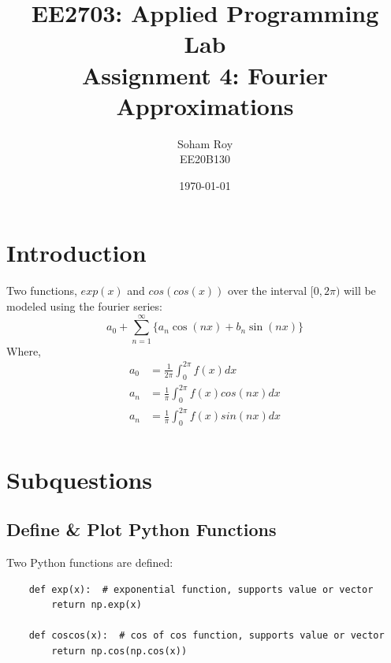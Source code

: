 \documentclass[12pt, a4paper]{article}
\title{EE2703: Applied Programming Lab \\ \Large Assignment 4: Fourier Approximations}
\author{Soham Roy \\ \normalsize EE20B130}
\date{\today}
\begin{document}
\maketitle %


\section{Introduction}
Two functions, $exp(x)$ and $cos(cos(x))$ over the interval $[0,2\pi)$ will be modeled using
the fourier series:
\begin{equation*}
    a_0 + \sum_{n=1}^{\infty} \{a_n \cos(nx) + b_n \sin(nx)\}
\end{equation*}
Where,
\begin{align*}
    a_0 & = \frac{1}{2\pi} \int_{0}^{2\pi} f(x) dx       \\
    a_n & = \frac{1}{\pi} \int_{0}^{2\pi} f(x)cos(nx) dx \\
    a_n & = \frac{1}{\pi} \int_{0}^{2\pi} f(x)sin(nx) dx \\
\end{align*}
\pagebreak


\section{Subquestions}
\subsection{Define \& Plot Python Functions}
Two Python functions are defined:

\begin{lstlisting}
    def exp(x):  # exponential function, supports value or vector
        return np.exp(x)

    def coscos(x):  # cos of cos function, supports value or vector
        return np.cos(np.cos(x))
\end{lstlisting}
\end{document}
